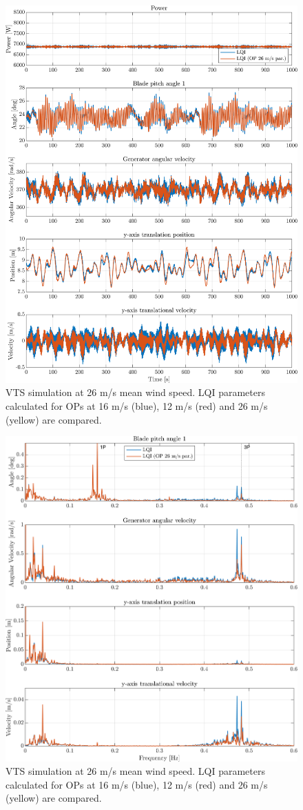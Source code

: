 \begin{figure}[ht]
	\centering
	\includegraphics[width=0.7\linewidth]{Graphics/TestResults/VTSplotting/30_pow_th_w_py_vy.png}
	\caption{VTS simulation at 26 m/s mean wind speed. LQI parameters calculated for OPs at 16 m/s (blue), 12 m/s (red) and 26 m/s (yellow) are compared.}
	\label{fig:vts_30_pow_th_w_py_vy}
\end{figure}
\begin{figure}[ht]
	\centering
	\includegraphics[width=0.7\linewidth]{Graphics/TestResults/VTSplotting/31_fft_th_w_py_vy.png}
	\caption{VTS simulation at 26 m/s mean wind speed. LQI parameters calculated for OPs at 16 m/s (blue), 12 m/s (red) and 26 m/s (yellow) are compared.}
	\label{fig:vts_31_fft_th_w_py_vy}
\end{figure}


